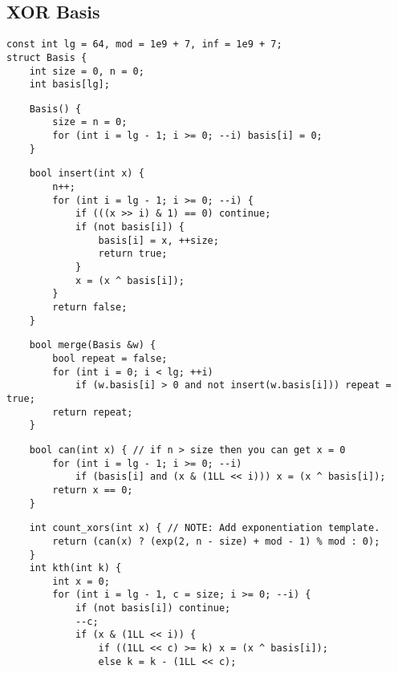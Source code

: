 \documentclass[twoside]{article}
\begin{document}
\begin{multicols*}{2}
{\subsection*{XOR Basis}
}
\begin{verbatim}
const int lg = 64, mod = 1e9 + 7, inf = 1e9 + 7;
struct Basis {
    int size = 0, n = 0;
    int basis[lg];
\end{verbatim}
\vspace{-12pt}
\begin{verbatim}
    Basis() {
        size = n = 0;
        for (int i = lg - 1; i >= 0; --i) basis[i] = 0;
    }
\end{verbatim}
\vspace{-12pt}
\begin{verbatim}
    bool insert(int x) {
        n++;
        for (int i = lg - 1; i >= 0; --i) {
            if (((x >> i) & 1) == 0) continue;
            if (not basis[i]) {
                basis[i] = x, ++size;
                return true;
            }
            x = (x ^ basis[i]);
        }
        return false;
    }
\end{verbatim}
\vspace{-12pt}
\begin{verbatim}
    bool merge(Basis &w) {
        bool repeat = false;
        for (int i = 0; i < lg; ++i)
            if (w.basis[i] > 0 and not insert(w.basis[i])) repeat = true;
        return repeat;
    }
\end{verbatim}
\vspace{-12pt}
\begin{verbatim}
    bool can(int x) { // if n > size then you can get x = 0
        for (int i = lg - 1; i >= 0; --i)
            if (basis[i] and (x & (1LL << i))) x = (x ^ basis[i]);
        return x == 0;
    }
\end{verbatim}
\vspace{-12pt}
\begin{verbatim}
    int count_xors(int x) { // NOTE: Add exponentiation template.
        return (can(x) ? (exp(2, n - size) + mod - 1) % mod : 0);
    }
    int kth(int k) {
        int x = 0;
        for (int i = lg - 1, c = size; i >= 0; --i) {
            if (not basis[i]) continue;
            --c;
            if (x & (1LL << i)) {
                if ((1LL << c) >= k) x = (x ^ basis[i]);
                else k = k - (1LL << c);

\end{verbatim}
\end{multicols*}
\end{document}
